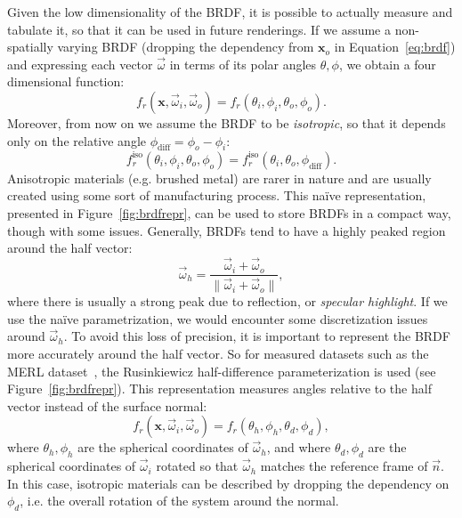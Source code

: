 Given the low dimensionality of the BRDF, it is possible to actually measure and tabulate it, so that it can be used in future renderings. If we assume a non-spatially varying BRDF (dropping the dependency from $\mathbf{x}_o$ in Equation~\ref{eq:brdf}) and expressing each vector $\vec{\omega}$ in terms of its polar angles $\theta, \phi$, we obtain a four dimensional function:
\begin{equation*}
f_r(\mathbf{x}, \vec{\omega}_i,  \vec{\omega}_o) = f_r(\theta_i, \phi_i, \theta_o, \phi_o).
\end{equation*}
Moreover, from now on we assume the BRDF to be \emph{isotropic}, so that it depends only on the relative angle $\phi_\text{diff} = \phi_o - \phi_i$:
\begin{equation*}
f_r^\text{iso}(\theta_i, \phi_i, \theta_o, \phi_o) = f_r^\text{iso}(\theta_i, \theta_o, \phi_\text{diff}).
\end{equation*}
Anisotropic materials (e.g. brushed metal) are rarer in nature and are usually created using some sort of manufacturing process.
This na\"ive representation, presented in Figure~\ref{fig:brdfrepr}, can be used to store BRDFs in a compact way, though with some issues. Generally, BRDFs tend to have a highly peaked region around the half vector:
\begin{equation*}\vec{\omega}_h = \frac{\vec{\omega}_i + \vec{\omega}_o}{\|\vec{\omega}_i + \vec{\omega}_o\|},
\end{equation*}
where there is usually a strong peak due to reflection, or \emph{specular highlight}. If we use the na\"ive parametrization, we would encounter some discretization issues around $\vec{\omega}_h$. To avoid this loss of precision, it is important to represent the BRDF more accurately around the half vector. So for measured datasets such as the MERL dataset~\cite{Matusik2003}, the Rusinkiewicz half-difference parameterization is used (see Figure~\ref{fig:brdfrepr}). This representation measures angles relative to the half vector instead of the surface normal:
\begin{equation*}
f_r(\mathbf{x}, \vec{\omega}_i,  \vec{\omega}_o) = f_r(\theta_h, \phi_h, \theta_d, \phi_d),
\end{equation*}
where $\theta_h, \phi_h$ are the spherical coordinates of $\vec{\omega}_h$, and where $\theta_d, \phi_d$ are the spherical coordinates of $\vec{\omega}_i$ rotated so that $\vec{\omega}_h$ matches the reference frame of $\vec{n}$. In this case,  isotropic materials can be described by dropping the dependency on $\phi_d$, i.e. the overall rotation of the system around the normal.

